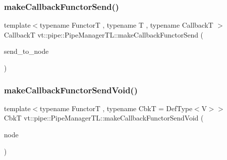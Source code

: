 \subsubsection{\texorpdfstring{make\+Callback\+Functor\+Send()}{makeCallbackFunctorSend()}\hspace{0.1cm}{\footnotesize\ttfamily [2/2]}}
{\footnotesize\ttfamily template$<$typename FunctorT , typename T , typename CallbackT $>$ \\
CallbackT vt\+::pipe\+::\+Pipe\+Manager\+T\+L\+::make\+Callback\+Functor\+Send (\begin{DoxyParamCaption}\item[{\hyperlink{namespacevt_a866da9d0efc19c0a1ce79e9e492f47e2}{Node\+Type} const \&}]{send\+\_\+to\+\_\+node }\end{DoxyParamCaption})}

\mbox{\label{structvt_1_1pipe_1_1_pipe_manager_t_l_ac2c128da30637e0672086df5abea84a3}} 
\subsubsection{\texorpdfstring{make\+Callback\+Functor\+Send\+Void()}{makeCallbackFunctorSendVoid()}\hspace{0.1cm}{\footnotesize\ttfamily [1/2]}}
{\footnotesize\ttfamily template$<$typename FunctorT , typename CbkT  = Def\+Type$<$\+V$>$$>$ \\
CbkT vt\+::pipe\+::\+Pipe\+Manager\+T\+L\+::make\+Callback\+Functor\+Send\+Void (\begin{DoxyParamCaption}\item[{\hyperlink{namespacevt_a866da9d0efc19c0a1ce79e9e492f47e2}{Node\+Type} const \&}]{node }\end{DoxyParamCaption})}

\mbox{\label{structvt_1_1pipe_1_1_pipe_manager_t_l_a71bfb005f664ca5f0f6935afbcdb17de}} 
